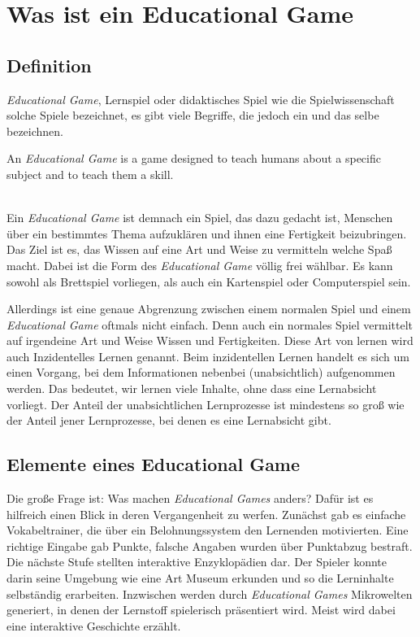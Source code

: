 \section{Was ist ein Educational Game}

\subsection{Definition}

\textit{Educational Game}, Lernspiel oder didaktisches Spiel wie die Spielwissenschaft solche Spiele bezeichnet, es gibt viele Begriffe, die jedoch ein und das selbe bezeichnen. \\

\begin{addmargin}[25pt]{0pt} 
\glqq An \textit{Educational Game} is a game designed to teach humans about a specific subject and to teach them a skill.\grqq \cite{F_DefinitionEducationalGame_3.2}
\end{addmargin}

\ \\ Ein \textit{Educational Game} ist demnach ein Spiel, das dazu gedacht ist, Menschen über ein bestimmtes Thema aufzuklären und ihnen eine Fertigkeit beizubringen. Das Ziel ist es, das Wissen auf eine Art und Weise zu vermitteln welche Spaß macht. Dabei ist die Form des \textit{Educational Game} völlig frei wählbar. Es kann sowohl als Brettspiel vorliegen, als auch ein Kartenspiel oder Computerspiel sein. 

Allerdings ist eine genaue Abgrenzung zwischen einem normalen Spiel und einem \textit{Educational Game} oftmals nicht einfach. Denn auch ein normales Spiel vermittelt auf irgendeine Art und Weise Wissen und Fertigkeiten. Diese Art von lernen wird auch \glqq Inzidentelles Lernen\grqq{} genannt. \glqq Beim inzidentellen Lernen handelt es sich um einen Vorgang, bei dem Informationen nebenbei (unabsichtlich) aufgenommen werden. Das bedeutet, wir lernen viele Inhalte, ohne dass eine Lernabsicht vorliegt. Der Anteil der unabsichtlichen Lernprozesse ist mindestens so groß wie der Anteil jener Lernprozesse, bei denen es eine Lernabsicht gibt. \grqq ~\cite{F_InzidentellesLernen_3.2} 

\subsection{Elemente eines Educational Game}
Die große Frage ist: Was machen \textit{Educational Games} anders? Dafür ist es hilfreich einen Blick in deren Vergangenheit zu werfen. Zunächst gab es einfache Vokabeltrainer, die über ein Belohnungssystem den Lernenden motivierten. Eine richtige Eingabe gab Punkte, falsche Angaben wurden über Punktabzug bestraft. Die nächste Stufe stellten interaktive Enzyklopädien dar. Der Spieler konnte darin seine Umgebung wie eine Art Museum erkunden und so die Lerninhalte selbständig erarbeiten. Inzwischen werden durch \textit{Educational Games} Mikrowelten generiert, in denen der Lernstoff spielerisch präsentiert wird. Meist wird dabei eine interaktive Geschichte erzählt. 

